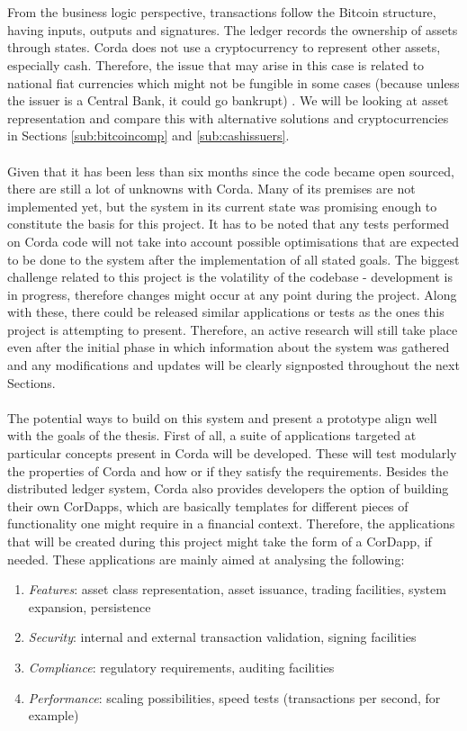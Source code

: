 \documentclass[12pt,twoside]{article}
\begin{document}
\\ \\
From the business logic perspective, transactions follow the Bitcoin structure, having inputs, outputs and signatures. The ledger records the ownership of assets through states. Corda does not use a cryptocurrency to represent other assets, especially cash. Therefore, the issue that may arise in this case is related to national fiat currencies which might not be fungible in some cases (because unless the issuer is a Central Bank, it could go bankrupt) \cite{Corda:TP}. We will be looking at asset representation and compare this with alternative solutions and cryptocurrencies in Sections \ref{sub:bitcoincomp} and \ref{sub:cashissuers}.
\\ \\
Given that it has been less than six months since the code became open sourced, there are still a lot of unknowns with Corda. Many of its premises are not implemented yet, but the system in its current state was promising enough to constitute the basis for this project. It has to be noted that any tests performed on Corda code will not take into account possible optimisations that are expected to be done to the system after the implementation of all stated goals. The biggest challenge related to this project is the volatility of the codebase - development is in progress, therefore changes might occur at any point during the project. Along with these, there could be released similar applications or tests as the ones this project is attempting to present. Therefore, an active research will still take place even after the initial phase in which information about the system was gathered and any modifications and updates will be clearly signposted throughout the next Sections. 
\\ \\
The potential ways to build on this system and present a prototype align well with the goals of the thesis. First of all, a suite of applications targeted at particular concepts present in Corda will be developed. These will test modularly the properties of Corda and how or if they satisfy the requirements. Besides the distributed ledger system, Corda also provides developers the option of building their own CorDapps, which are basically templates for different pieces of functionality one might require in a financial context. Therefore, the applications that will be created during this project might take the form of a CorDapp, if needed. These applications are mainly aimed at analysing the following:
\begin{enumerate}
\item \textit{Features}: asset class representation, asset issuance, trading facilities, system expansion, persistence
\item \textit{Security}: internal and external transaction validation, signing facilities
\item \textit{Compliance}: regulatory requirements, auditing facilities
\item \textit{Performance}: scaling possibilities, speed tests (transactions per second, for example)
\end{enumerate}
\end{document}
